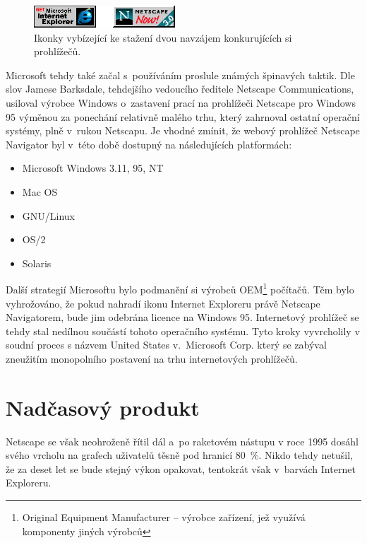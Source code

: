 \documentclass[a4paper, 11pt]{scrartcl}
\begin{document}
\begin{figure}[ht]
\centering
\includegraphics[scale=1]{icons.png}
\caption{Ikonky vybízející ke stažení dvou navzájem konkurujících si prohlížečů.}
\label{fig:one}
\end{figure}

Microsoft tehdy také začal s~používáním proslule známých špinavých taktik. Dle slov Jamese Barksdale, tehdejšího vedoucího ředitele Netscape Communications, usiloval výrobce Windows o~zastavení prací na prohlížeči Netscape pro Windows 95 výměnou za ponechání relativně malého trhu, který zahrnoval ostatní operační systémy, plně v~rukou Netscapu.\cite{competing} Je vhodné zmínit, že webový prohlížeč Netscape Navigator byl v~této době dostupný na následujících platformách:

\begin{itemize}
\item Microsoft Windows 3.11, 95, NT
\item Mac OS
\item GNU/Linux
\item OS/2
\item Solaris
\end{itemize}

\newpage

Další strategií Microsoftu bylo podmanění si výrobců OEM\footnote{Original Equipment Manufacturer – výrobce zařízení, jež využívá komponenty jiných výrobců} počítačů. Těm bylo vyhrožováno, že pokud nahradí ikonu Internet Exploreru právě Netscape Navigatorem, bude jim odebrána licence na Windows 95.\cite{bbc} Internetový prohlížeč se tehdy stal nedílnou součástí tohoto operačního systému. Tyto kroky vyvrcholily v soudní proces s názvem United States v.~Microsoft Corp. který se zabýval zneužitím monopolního postavení na trhu internetových prohlížečů.

\section{Nadčasový produkt}
Netscape se však neohroženě řítil dál a~po raketovém nástupu v roce 1995 dosáhl svého vrcholu na grafech uživatelů těsně pod hranicí 80~\%. Nikdo tehdy netušil, že za deset let se bude stejný výkon opakovat, tentokrát však v~barvách Internet Exploreru.
\end{document}
